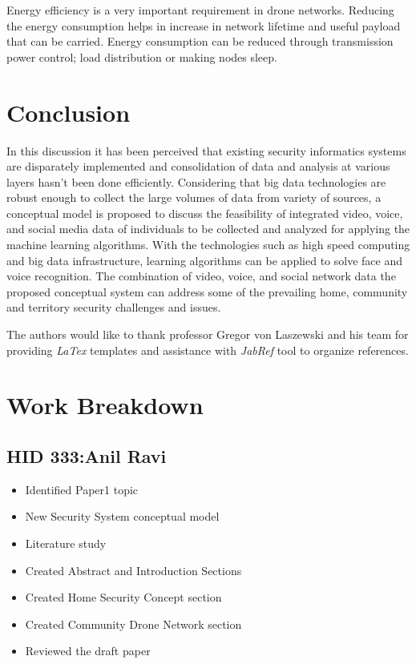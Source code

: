 \documentclass[sigconf]{acmart}
\begin{document}
Energy efficiency is a very important requirement in drone networks. Reducing the energy consumption helps in increase in network lifetime and useful payload that can be carried. Energy consumption can be reduced through transmission power control; load distribution or making nodes sleep\cite{Gupta2015}.


\section{Conclusion}
In this discussion it has been perceived that existing security informatics systems are disparately implemented and consolidation of data and analysis at various layers hasn't been done efficiently. Considering that big data technologies are robust enough to collect the large volumes of data from variety of sources, a conceptual model is proposed to discuss the feasibility of integrated video, voice, and social media data of individuals to be collected and analyzed for applying the machine learning algorithms. With the technologies such as high speed computing and big data infrastructure, learning algorithms can be applied to solve face and voice recognition. The combination of video, voice, and social network data the proposed conceptual system can address some of the prevailing home, community and territory security challenges and issues.

\begin{acks}
The authors would like to thank professor Gregor von Laszewski and his team for providing \textit{LaTex} templates and assistance with \textit{JabRef} tool to organize references.
\end{acks}


 

\appendix
\section{Work Breakdown}
\subsection{HID 333:Anil Ravi}
\begin{itemize}
  \item Identified Paper1 topic
  \item New Security System conceptual model 
  \item Literature study
  \item Created Abstract and Introduction Sections
  \item Created Home Security Concept section
  \item Created Community Drone Network section
  \item Reviewed the draft paper
\end{itemize}
\end{document}

